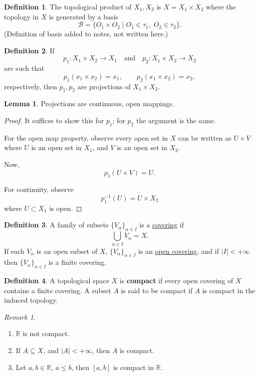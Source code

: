 \documentclass[11pt]{article}
\theoremstyle{definition}
\newtheorem{definition}{Definition}[section]
\newtheorem{lemma}{Lemma}[section]
\theoremstyle{remark}
\newtheorem{remark}{Remark}[section]
\begin{document}
\begin{definition}\label{def:product_topology}
The topological product of $X_1,X_2$ is $X=X_1\times X_2$ where the topology in $X$ is generated by a basis
\[
\mathcal B=\{O_1\times O_2\mid O_1\in\tau_1,\;O_2\in\tau_2\}.
\]
(Definition of basis added to notes, not written here.)
\end{definition}

\begin{definition}\label{def:projections}
If
\[
p_1:X_1\times X_2\rightarrow X_1
\quad\text{and}\quad
p_2:X_1\times X_2\rightarrow X_2
\]
are such that
\[
p_1(x_1\times x_2)=x_1,
\qquad
p_2(x_1\times x_2)=x_2,
\]
respectively, then $p_1,p_2$ are projections of $X_1\times X_2$.
\end{definition}

\begin{lemma}\label{lem:projections_continuous_open}
Projections are continuous, open mappings.
\end{lemma}

\begin{proof}
It suffices to show this for $p_1$; for $p_2$ the argument is the same.

For the open map property, observe every open set in $X$ can be written as $U\times V$ where $U$ is an open set in $X_1$, and $V$ is an open set in $X_2$.

Now,
\[
p_1(U\times V)=U.
\]

For continuity, observe
\[
p_1^{-1}(U)=U\times X_2
\]
where $U\subset X_1$ is open.
\end{proof}

\begin{definition}\label{def:covering}
A family of subsets $\{V_\alpha\}_{\alpha\in I}$ is a \underline{covering} if
\[
\bigcup_{\alpha\in I}V_\alpha=X.
\]
If each $V_\alpha$ is an open subset of $X$, $\{V_\alpha\}_{\alpha\in I}$ is an \underline{open covering}, and if $|I|<+\infty$ then $\{V_\alpha\}_{\alpha\in I}$ is a finite covering.
\end{definition}

\begin{definition}\label{def:compact}
A topological space $X$ is \textbf{compact} if every open covering of $X$ contains a finite covering. A subset $A$ is said to be compact if $A$ is compact in the induced topology.
\end{definition}

\begin{remark}\label{rem:compactness_examples}
\begin{enumerate}
\item $\mathbb R$ is not compact.
\item If $A\subseteq X$, and $|A|<+\infty$, then $A$ is compact.
\item Let $a,b\in\mathbb R$, $a\le b$, then $[a,b]$ is compact in $\mathbb R$.
\end{enumerate}
\end{remark}
\end{document}

